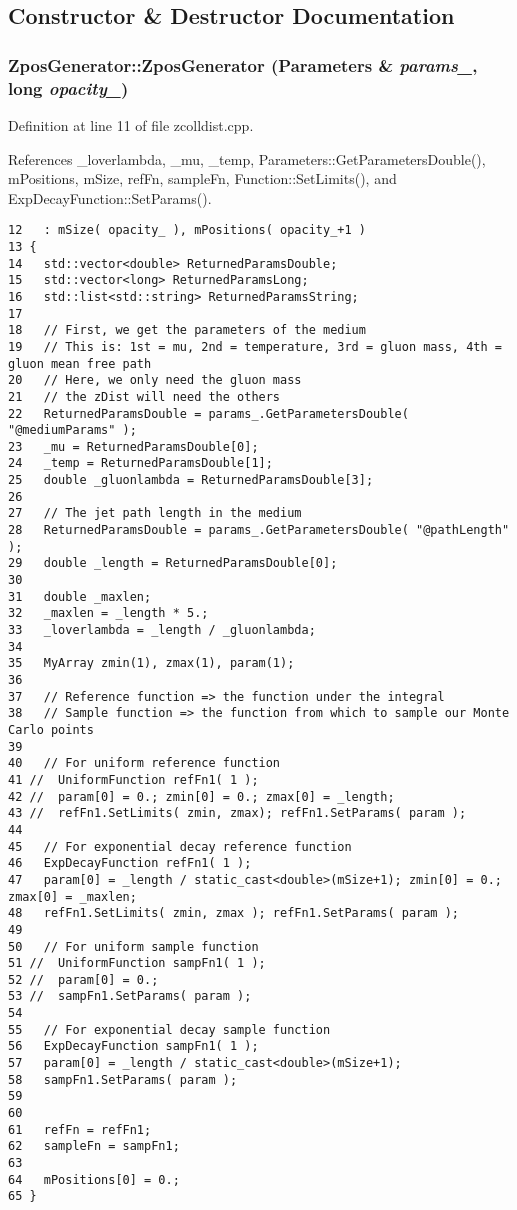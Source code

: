 \subsection{Constructor \& Destructor Documentation}
\subsubsection{\setlength{\rightskip}{0pt plus 5cm}ZposGenerator::ZposGenerator ({\bf Parameters} \& {\em params\_\-}, long {\em opacity\_\-})}\label{classZposGenerator_1e90862f06141844d8d663502b4c0cdc}




Definition at line 11 of file zcolldist.cpp.

References \_\-loverlambda, \_\-mu, \_\-temp, Parameters::GetParametersDouble(), mPositions, mSize, refFn, sampleFn, Function::SetLimits(), and ExpDecayFunction::SetParams().

\begin{Code}\begin{verbatim}12   : mSize( opacity_ ), mPositions( opacity_+1 )
13 {
14   std::vector<double> ReturnedParamsDouble;
15   std::vector<long> ReturnedParamsLong;
16   std::list<std::string> ReturnedParamsString;
17 
18   // First, we get the parameters of the medium
19   // This is: 1st = mu, 2nd = temperature, 3rd = gluon mass, 4th = gluon mean free path
20   // Here, we only need the gluon mass
21   // the zDist will need the others
22   ReturnedParamsDouble = params_.GetParametersDouble( "@mediumParams" );
23   _mu = ReturnedParamsDouble[0];
24   _temp = ReturnedParamsDouble[1];
25   double _gluonlambda = ReturnedParamsDouble[3];
26 
27   // The jet path length in the medium
28   ReturnedParamsDouble = params_.GetParametersDouble( "@pathLength" );
29   double _length = ReturnedParamsDouble[0];
30 
31   double _maxlen;
32   _maxlen = _length * 5.;
33   _loverlambda = _length / _gluonlambda;
34 
35   MyArray zmin(1), zmax(1), param(1);
36 
37   // Reference function => the function under the integral
38   // Sample function => the function from which to sample our Monte Carlo points
39 
40   // For uniform reference function
41 //  UniformFunction refFn1( 1 );
42 //  param[0] = 0.; zmin[0] = 0.; zmax[0] = _length;
43 //  refFn1.SetLimits( zmin, zmax); refFn1.SetParams( param );
44 
45   // For exponential decay reference function
46   ExpDecayFunction refFn1( 1 );
47   param[0] = _length / static_cast<double>(mSize+1); zmin[0] = 0.; zmax[0] = _maxlen;
48   refFn1.SetLimits( zmin, zmax ); refFn1.SetParams( param );
49 
50   // For uniform sample function
51 //  UniformFunction sampFn1( 1 );
52 //  param[0] = 0.; 
53 //  sampFn1.SetParams( param );
54 
55   // For exponential decay sample function
56   ExpDecayFunction sampFn1( 1 );
57   param[0] = _length / static_cast<double>(mSize+1);
58   sampFn1.SetParams( param );
59 
60 
61   refFn = refFn1;
62   sampleFn = sampFn1;
63 
64   mPositions[0] = 0.;
65 }
\end{verbatim}
\end{Code}





